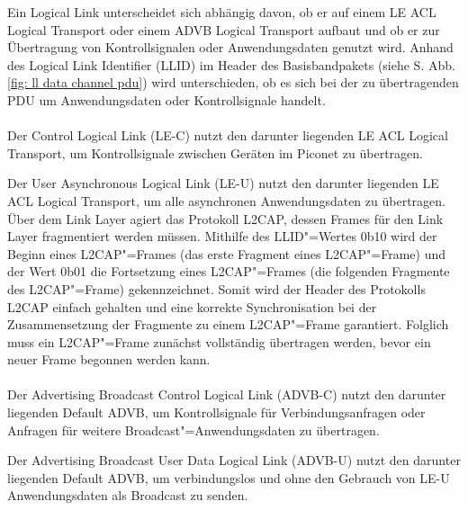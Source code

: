 Ein Logical Link unterscheidet sich abhängig davon, ob er auf einem LE ACL Logical Transport oder einem ADVB Logical Transport aufbaut und ob er zur Übertragung von Kontrollsignalen oder Anwendungsdaten genutzt wird. Anhand des Logical Link Identifier (LLID) im Header des Basisbandpakets (siehe S. \pageref{fig: ll data channel pdu} Abb. \ref{fig: ll data channel pdu}) wird unterschieden, ob es sich bei der zu übertragenden PDU um Anwendungsdaten oder Kontrollsignale handelt.
\\\\
Der Control Logical Link (LE-C) nutzt den darunter liegenden LE ACL Logical Transport, um Kontrollsignale zwischen Geräten im Piconet zu übertragen.

Der User Asynchronous Logical Link (LE-U) nutzt den darunter liegenden LE ACL Logical Transport, um alle asynchronen Anwendungsdaten zu übertragen. Über dem Link Layer agiert das Protokoll L2CAP, dessen Frames für den Link Layer fragmentiert werden müssen. Mithilfe des LLID"=Wertes 0b10 wird der Beginn eines L2CAP"=Frames (das erste Fragment eines L2CAP"=Frame) und der Wert 0b01 die Fortsetzung eines L2CAP"=Frames (die folgenden Fragmente des L2CAP"=Frame) gekennzeichnet. Somit wird der Header des Protokolls L2CAP einfach gehalten und eine korrekte Synchronisation bei der Zusammensetzung der Fragmente zu einem L2CAP"=Frame garantiert. Folglich muss ein L2CAP"=Frame zunächst vollständig übertragen werden, bevor ein neuer Frame begonnen werden kann. \cite{BtSpec4.0_176-177}
\\\\
Der Advertising Broadcast Control Logical Link (ADVB-C) nutzt den darunter liegenden Default ADVB, um Kontrollsignale für Verbindungsanfragen oder Anfragen für weitere Broadcast"=Anwendungsdaten zu übertragen.

Der Advertising Broadcast User Data Logical Link (ADVB-U) nutzt den darunter liegenden Default ADVB, um verbindungslos und ohne den Gebrauch von LE-U Anwendungsdaten als Broadcast zu senden. \cite{BtSpec4.0_176-177}
